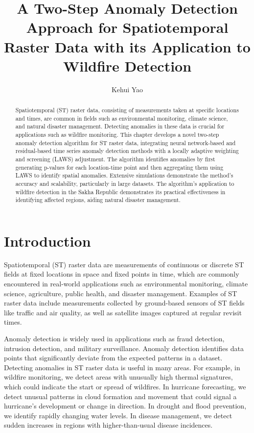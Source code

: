 \documentclass[11pt]{article}
\title{A Two-Step Anomaly Detection Approach for Spatiotemporal Raster Data with its Application to Wildfire Detection}
\author[1]{Kehui Yao}
\affil[1]{Department of Statistics, University of Wisconsin-Madison}
\date{}
\begin{document}
\maketitle

\begin{abstract}
Spatiotemporal (ST) raster data, consisting of measurements taken at specific locations and times, are common in fields such as environmental monitoring, climate science, and natural disaster management. Detecting anomalies in these data is crucial for applications such as wildfire monitoring. This chapter develops a novel two-step anomaly detection algorithm for ST raster data, integrating neural network-based and residual-based time series anomaly detection methods with a locally adaptive weighting and screening (LAWS) adjustment. The algorithm identifies anomalies by first generating p-values for each location-time point and then aggregating them using LAWS to identify spatial anomalies. Extensive simulations demonstrate the method's accuracy and scalability, particularly in large datasets. The algorithm's application to wildfire detection in the Sakha Republic demonstrates its practical effectiveness in identifying affected regions, aiding natural disaster management.

\end{abstract}

\section{Introduction}
Spatiotemporal (ST) raster data are measurements of continuous or discrete ST fields at fixed locations in space and fixed points in time, which are commonly encountered in real-world applications such as environmental monitoring, climate science, agriculture, public health, and disaster management. Examples of ST raster data include measurements collected by ground-based sensors of ST fields like traffic and air quality, as well as satellite images captured at regular revisit times. 
 
 Anomaly detection is widely used in applications such as fraud detection, intrusion detection, and military surveillance. Anomaly detection identifies data points that significantly deviate from the expected patterns in a dataset.  Detecting anomalies in ST raster data is useful in many areas. For example, in wildfire monitoring, we detect areas with unusually high thermal signatures, which could indicate the start or spread of wildfires. In hurricane forecasting, we detect unusual patterns in cloud formation and movement that could signal a hurricane's development or change in direction. In drought and flood prevention, we identify rapidly changing water levels. In disease management, we detect sudden increases in regions with higher-than-usual disease incidences.
\end{document}
